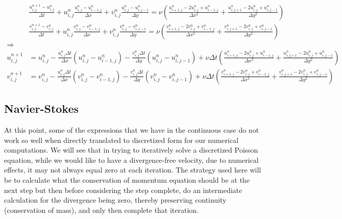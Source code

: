 \documentclass[11pt]{article}
\begin{document}
{\begin{align}
&\frac{u^{n+1}_{i,j} - u^{n}_{i,j}}{\Delta t}
	+ u^n_{i,j} \frac{u^{n}_{i,j} - u^{n}_{i-1,j}}{\Delta x}
	+ v^n_{i,j} \frac{u^{n}_{i,j} - u^{n}_{i,j-1}}{\Delta y}
=\nu	\left( \frac{u^n_{i+1,j} - 2u^n_{i,j} + u^n_{i-1,j}}{\Delta x^2} \right.
  + \left. \frac{u^n_{i,j+1} - 2u^n_{i,j} + u^n_{i,j-1}}{\Delta y^2} \right)	
																	\nonumber \\
&\frac{v^{n+1}_{i,j} - v^{n}_{i,j}}{\Delta t}
	+ u^n_{i,j} \frac{v^{n}_{i,j} - v^{n}_{i-1,j}}{\Delta x}
	+ v^n_{i,j} \frac{v^{n}_{i,j} - v^{n}_{i,j-1}}{\Delta y}
=\nu
	\left( \frac{v^n_{i+1,j} - 2v^n_{i,j} + v^n_{i-1,j}}{\Delta x^2} \right.
  + \left. \frac{v^n_{i,j+1} - 2v^n_{i,j} + v^n_{i,j-1}}{\Delta y^2} \right)	
																		 \\
\Rightarrow ~~ \nonumber \\
u^{n+1}_{i,j}
	&= u^n_{i,j}
	- \frac{u^n_{i,j} \Delta t}{\Delta x}(u^n_{i,j} - u^n_{i-1,j})
	- \frac{v^n_{i,j} \Delta t}{\Delta y}(u^n_{i,j} - u^n_{i,j-1})
	+\nu \Delta t \left( \frac{u^n_{i+1,j} - 2u^n_{i,j} + u^n_{i-1,j}}{\Delta x^2} \right.
	            + \left. \frac{u^n_{i,j+1} - 2u^n_{i,j} + u^n_{i,j-1}}{\Delta y^2} \right)	
																 \nonumber \\
v^{n+1}_{i,j}
	&= v^n_{i,j}
	- \frac{u^n_{i,j} \Delta t}{\Delta x}(v^n_{i,j} - v^n_{i-1,j})
	- \frac{v^n_{i,j} \Delta t}{\Delta y}(v^n_{i,j} - v^n_{i,j-1})
	+\nu \Delta t \left( \frac{v^n_{i+1,j} - 2v^n_{i,j} + v^n_{i-1,j}}{\Delta x^2} \right.
			   + \left. \frac{v^n_{i,j+1} - 2v^n_{i,j} + v^n_{i,j-1}}{\Delta y^2} \right)	
\end{align}

\subsection{Navier-Stokes}
At this point, some of the expressions that we have in the continuous case do not work so well
when directly translated to discretized form for our numerical computations.
We will see that in trying to iteratively solve a discretized Poisson equation, while we would
like to have a divergence-free velocity,
due to numerical effects, it may not always equal zero at each iteration. The strategy used
here will be to calculate what the conservation of momentum equation should be at the next step
but then before considering the step complete, do an intermediate calculation for the divergence
being zero, thereby preserving continuity (conservation of mass), and only then complete that
iteration.

}
\end{document}
